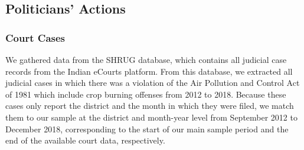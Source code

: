 \documentclass[12pt]{article}
\newcommand{\red}[1]{\textcolor{red}{#1}}
\begin{document}

\subsection{Politicians' Actions}
\subsubsection{Court Cases\label{ssec:courts}} We gathered data from the SHRUG \citep{shrug_judicial} database, which contains all judicial case records from the Indian eCourts platform. From this database, we extracted all judicial cases in which there was a violation of the Air Pollution and Control Act of 1981 which include crop burning offenses from 2012 to 2018. 
%
Because these cases only report the district and the month in which they were filed, we match them to our sample at the district and month-year level from September 2012 to December 2018, corresponding to the start of our main sample period and the end of the available court data, respectively.
\end{document}
